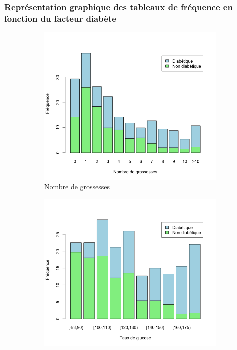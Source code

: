 \documentclass[a4paper,10pt]{report}
\begin{document}
\subsubsection{Représentation graphique des tableaux de fréquence en fonction du facteur diabète}


\begin{figure}[H]
	\centering
	\captionsetup{justification=centering, margin=2cm}
	\begin{subfigure}[b]{0.25\linewidth}
		\centering
		\captionsetup{justification=centering}
		\includegraphics[width=1\linewidth]{img/1-3-2-barplot-freq-diabete-grossesses}
		\caption{\scriptsize Nombre de grossesses}
		\label{fig:1-3-2-barplot-freq-diabete-grossesses}
	\end{subfigure}%
	\begin{subfigure}[b]{0.25\linewidth}
		\centering
		\captionsetup{justification=centering}
		\includegraphics[width=1\linewidth]{img/1-3-2-barplot-freq-diabete-glucose}

\end{subfigure}
\end{figure}
\end{document}
